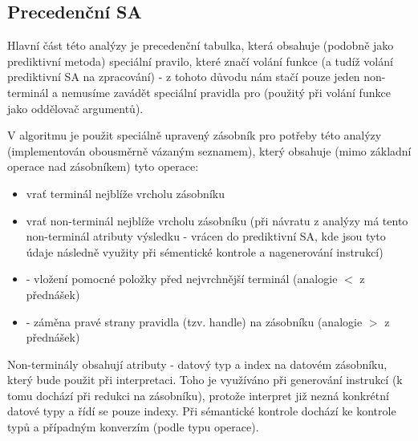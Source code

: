 \subsection{Precedenční SA}

Hlavní část této analýzy je precedenční tabulka, která obsahuje (podobně jako prediktivní metoda) speciální pravilo, které značí volání funkce (a tudíž volání prediktivní SA na zpracování) - z tohoto důvodu nám stačí pouze jeden non-terminál a nemusíme zavádět speciální pravidla pro  (použitý při volání funkce jako oddělovač argumentů).

V algoritmu je použit speciálně upravený zásobník pro potřeby této analýzy (implementován obousměrně vázaným seznamem), který obsahuje (mimo základní operace nad zásobníkem) tyto operace:
\begin{itemize}
\item vrať terminál nejblíže vrcholu zásobníku
\item vrať non-terminál nejblíže vrcholu zásobníku (při návratu z analýzy má tento non-terminál atributy výsledku - vrácen do prediktivní SA, kde jsou tyto údaje následně využity při sémentické kontrole a nagenerování instrukcí)
\item {} - vložení pomocné položky před nejvrchnější terminál (analogie $<$ z přednášek)
\item {} - záměna pravé strany pravidla (tzv. handle) na zásobníku (analogie $>$ z přednášek)
\end{itemize}

Non-terminály obsahují atributy - datový typ a index na datovém zásobníku, který bude použit při interpretaci. Toho je využíváno při generování instrukcí (k tomu dochází při redukci na zásobníku), protože interpret již nezná konkrétní datové typy a řídí se pouze indexy. Při sémantické kontrole dochází ke kontrole typů a případným konverzím (podle typu operace).
